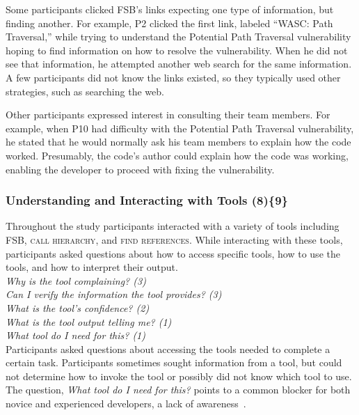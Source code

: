 \documentclass{sig-alternate}
\begin{document}
Some participants clicked FSB's links expecting one type of information, but finding another. 
For example, P2 clicked the first link, labeled ``WASC: Path Traversal,'' while trying to understand the Potential Path Traversal vulnerability hoping to find information on how to resolve the vulnerability.
When he did not see that information, he attempted another web search for the same information. 
A few participants did not know the links existed, so they typically used other strategies, such as searching the web.

Other participants expressed interest in consulting their team members. 
For example, when P10 had difficulty with the Potential Path Traversal vulnerability, he stated that he would normally ask his team members to explain how the code worked.
Presumably, the code's author could explain how the code was working, enabling the developer to proceed with fixing the vulnerability.



\subsubsection{\textbf{Understanding and Interacting with Tools (8)\{9\}}}\label{uit}

Throughout the study participants interacted with a variety of tools including FSB, \textsc{call hierarchy}, and \textsc{find references}. 
While interacting with these tools, participants asked questions about how to access specific tools, how to use the tools, and how to interpret their output. 
\\

\noindent\emph{Why is the tool complaining? (3)} \\
\emph{Can I verify the information the tool provides? (3)} \\
\emph{What is the tool's confidence? (2)} \\
\emph{What is the tool output telling me? (1)} \\
\emph{What tool do I need for this? (1)} 
\\

Participants asked questions about accessing the tools needed to complete a certain task.
Participants sometimes sought information from a tool, but could not determine how to invoke the tool or possibly did not know which tool to use. 
The question, \emph{What tool do I need for this?} points to a common blocker for both novice and experienced developers, a lack of awareness~\cite{murphy-Hill2012fluency}.
\end{document}
